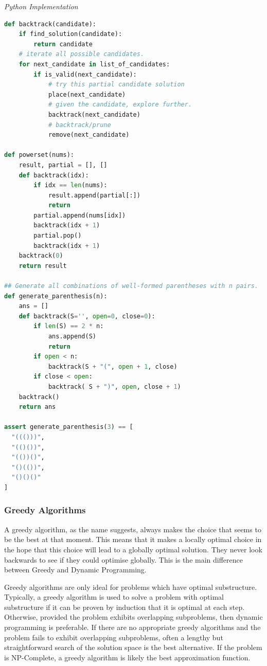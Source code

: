 \documentclass{article}
\begin{document}
\vspace{8pt} \emph{Python Implementation}
\begin{lstlisting}[language=Python]
def backtrack(candidate):
    if find_solution(candidate):
        return candidate
    # iterate all possible candidates.
    for next_candidate in list_of_candidates:
        if is_valid(next_candidate):
            # try this partial candidate solution
            place(next_candidate)
            # given the candidate, explore further.
            backtrack(next_candidate)
            # backtrack/prune
            remove(next_candidate)

def powerset(nums):
    result, partial = [], []
    def backtrack(idx):
        if idx == len(nums):
            result.append(partial[:])
            return
        partial.append(nums[idx])
        backtrack(idx + 1)
        partial.pop()
        backtrack(idx + 1)
    backtrack(0)
    return result
    
## Generate all combinations of well-formed parentheses with n pairs.
def generate_parenthesis(n):
    ans = []
    def backtrack(S='', open=0, close=0):
        if len(S) == 2 * n:
            ans.append(S)
            return
        if open < n:
            backtrack(S + "(", open + 1, close)
        if close < open:
            backtrack( S + ")", open, close + 1)
    backtrack()    
    return ans
    
assert generate_parenthesis(3) == [
  "((()))",
  "(()())",
  "(())()",
  "()(())",
  "()()()"
]
\end{lstlisting}
    
    \subsubsection{Greedy Algorithms}
    A greedy algorithm, as the name suggests, always makes the choice that seems to be the best at that moment. This means that it makes a locally optimal choice in the hope that this choice will lead to a globally optimal solution. They never look backwards to see if they could optimise globally. This is the main difference between Greedy and Dynamic Programming.

    Greedy algorithms are only ideal for problems which have optimal substructure. Typically, a greedy algorithm is used to solve a problem with optimal substructure if it can be proven by induction that it is optimal at each step. Otherwise, provided the problem exhibits overlapping subproblems, then dynamic programming is preferable. If there are no appropriate greedy algorithms and the problem fails to exhibit overlapping subproblems, often a lengthy but straightforward search of the solution space is the best alternative. If the problem is NP-Complete, a greedy algorithm is likely the best approximation function.
    
\end{document}
